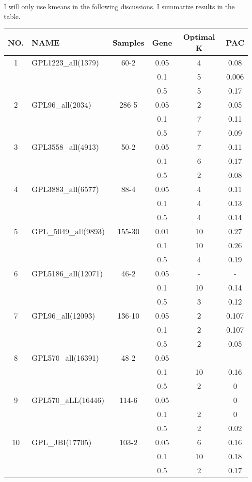 \documentclass[12pt]{article}
\begin{document}
I will only use kmeans in the following discussions. I summarize results in the table.
\begin{longtable}{c|l|cccc}
\hline
 \bf\color{blue} NO.&\bf\color{blue}NAME&\bf\color{blue}Samples&\bf\color{blue}Gene&\bf\color{blue} Optimal K&\bf\color{blue} PAC  \\
\hline
  1 & GPL1223\_all(1379) & 60-2 &0.05& 4 & 0.08 \\
    & & & 0.1 & 5 & 0.006 \\
  & & & 0.5 & 5 & 0.17 \\ \hline
  2 & GPL96\_all(2034) & 286-5 & 0.05 & 2 & 0.05  \\
                    & & & 0.1 & 7 & 0.11 \\
  & & & 0.5 & 7 & 0.09 \\ \hline
  3 & GPL3558\_all(4913) & 50-2 & 0.05 & 7 & 0.11 \\
                    & & & 0.1 & 6& 0.17\\
  & & & 0.5 & 2 & 0.08\\ \hline
  4 & GPL3883\_all(6577) & 88-4 & 0.05 & 4 & 0.11\\
                    & & & 0.1 & 4 & 0.13\\
  & & & 0.5 & 4 & 0.14\\ \hline
  5 & GPL\_5049\_all(9893) & 155-30 & 0.01 & 10 & 0.27\\
                     & & & 0.1 & 10 & 0.26 \\
  & & & 0.5 & 4 & 0.19 \\ \hline
  6 & GPL5186\_all(12071) & 46-2 & 0.05 & -&- \\
                      & & & 0.1 & 10 & 0.14 \\
  & & & 0.5 & 3 & 0.12 \\ \hline
  7 & GPL96\_all(12093) & 136-10 & 0.05 & 2 & 0.107\\
                       & & & 0.1 &2 &0.107  \\
  & & & 0.5 & 2 & 0.05  \\ \hline
  8 & GPL570\_all(16391) & 48-2 & 0.05 & & \\
                       & & & 0.1 & 10 & 0.16 \\
  & & & 0.5 & 2 & 0 \\ \hline
  9 & GPL570\_aLL(16446) & 114-6 & 0.05 & & 0 \\
                        & & & 0.1 &2 & 0 \\
  & & & 0.5 & 2 & 0.02 \\ \hline
  10 & GPL\_JBI(17705) & 103-2 & 0.05 & 6 & 0.16 \\
                       & & & 0.1 &10 &0.18  \\
  & & & 0.5 & 2&0.17  \\ \hline
 

\end{longtable}
\end{document}

